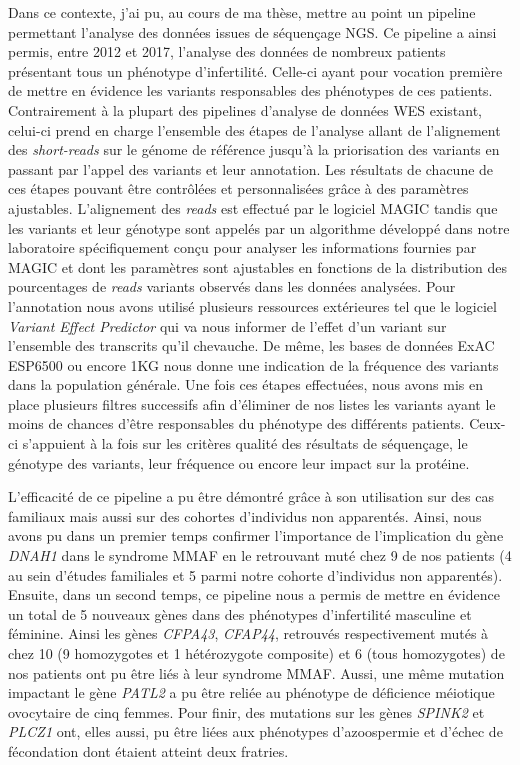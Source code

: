\documentclass[12pt,a4paper,twoside]{ugathesis}
\theoremstyle{definition}
\theoremstyle{definition}
\theoremstyle{definition}
\theoremstyle{remark}
\begin{document}
Dans ce contexte, j'ai pu, au cours de ma thèse, mettre au point un
pipeline permettant l'analyse des données issues de séquençage NGS. Ce
pipeline a ainsi permis, entre 2012 et 2017, l'analyse des données de
nombreux patients présentant tous un phénotype d'infertilité. Celle-ci
ayant pour vocation première de mettre en évidence les variants
responsables des phénotypes de ces patients. Contrairement à la plupart
des pipelines d'analyse de données WES existant, celui-ci prend en
charge l'ensemble des étapes de l'analyse allant de l'alignement des
\emph{short-reads} sur le génome de référence jusqu'à la priorisation
des variants en passant par l'appel des variants et leur annotation. Les
résultats de chacune de ces étapes pouvant être contrôlées et
personnalisées grâce à des paramètres ajustables. L'alignement des
\emph{reads} est effectué par le logiciel MAGIC tandis que les variants
et leur génotype sont appelés par un algorithme développé dans notre
laboratoire spécifiquement conçu pour analyser les informations fournies
par MAGIC et dont les paramètres sont ajustables en fonctions de la
distribution des pourcentages de \emph{reads} variants observés dans les
données analysées. Pour l'annotation nous avons utilisé plusieurs
ressources extérieures tel que le logiciel \emph{Variant Effect
Predictor} qui va nous informer de l'effet d'un variant sur l'ensemble
des transcrits qu'il chevauche. De même, les bases de données ExAC
ESP6500 ou encore 1KG nous donne une indication de la fréquence des
variants dans la population générale. Une fois ces étapes effectuées,
nous avons mis en place plusieurs filtres successifs afin d'éliminer de
nos listes les variants ayant le moins de chances d'être responsables du
phénotype des différents patients. Ceux-ci s'appuient à la fois sur les
critères qualité des résultats de séquençage, le génotype des variants,
leur fréquence ou encore leur impact sur la protéine.

L'efficacité de ce pipeline a pu être démontré grâce à son utilisation
sur des cas familiaux mais aussi sur des cohortes d'individus non
apparentés. Ainsi, nous avons pu dans un premier temps confirmer
l'importance de l'implication du gène \emph{DNAH1} dans le syndrome MMAF
en le retrouvant muté chez 9 de nos patients (4 au sein d'études
familiales et 5 parmi notre cohorte d'individus non apparentés).
Ensuite, dans un second temps, ce pipeline nous a permis de mettre en
évidence un total de 5 nouveaux gènes dans des phénotypes d'infertilité
masculine et féminine. Ainsi les gènes \emph{CFPA43}, \emph{CFAP44},
retrouvés respectivement mutés à chez 10 (9 homozygotes et 1
hétérozygote composite) et 6 (tous homozygotes) de nos patients ont pu
être liés à leur syndrome MMAF. Aussi, une même mutation impactant le
gène \emph{PATL2} a pu être reliée au phénotype de déficience méiotique
ovocytaire de cinq femmes. Pour finir, des mutations sur les gènes
\emph{SPINK2} et \emph{PLCZ1} ont, elles aussi, pu être liées aux
phénotypes d'azoospermie et d'échec de fécondation dont étaient atteint
deux fratries.
\end{document}
